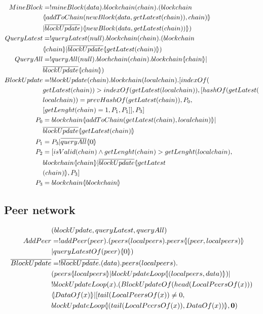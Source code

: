 \begin{align*}
    MineBlock &= !mineBlock(data).blockchain(chain).(blockchain\\
        &\lift{}{addToChain(newBlock(data,getLatest(chain)),chain)}\\
        &|\overline{blockUpdate})\lift{}{newBlock(data, getLatest(chain))})\\
    QueryLatest &=!queryLatest(null).blockchain(chain).(blockchain\\
        &\lift{}{chain}|\overline{blockUpdate}\lift{}{getLatest(chain)})\\
        QueryAll &= !queryAll(null).blochchain(chain).blockchain\lift{}{chain}|\\
        &\overline{blockUpdate}\lift{}{chain})\\
    BlockUpdate &= !blockUpdate(chain).blockchain(localchain).[indexOf(\\
        &getLatest(chain))>indexOf(getLatest(localchain)),[hashOf(getLatest(\\
        &localchain))=prevHashOf(getLatest(chain)),P_0,\\
        &[getLenght(chain)=1,P_1,P_1]],P_3]\\
    P_0 &= blockchain\lift{}{addToChain(getLatest(chain),localchain)}|\\
        &\overline{blockUpdate}\lift{}{getLatest(chain)}\\
    P_1 &= P_3|\overline{queryAll}\lift{}{0}\\
    P_2 &= [isValid(chain) \land getLenght(chain) > getLenght(localchain),\\
        &blockchain\lift{}{chain}|\overline{blockUpdate}\lift{}{getLatest\\
        &(chain)},P_3]\\
    P_3 &= blockchain\lift{}{blockchain}
\end{align*}

\subsection{Peer network}

\begin{align*}
    &(blockUpdate, queryLatest, queryAll)\\
    AddPeer &= !addPeer(peer).(peers(localpeers).peers\lift{}{(peer,localpeers)}\\
        &|queryLatestOf(peer)\lift{}{0})\\
    \overline{BlockUpdate} &= !\overline{blockUpdate}.(data).peers(localpeers).\\
        &(peers\lift{}{localpeers}|blockUpdateLoop\lift{}{(localpeers,data)})|\\
        &!blockUpdateLoop(x).(BlockUpdateOf(head(LocalPeersOf(x)))\\
        &\lift{}{DataOf(x)}|[tail(LocalPeersOf(x))\not= 0,\\
        &blockUpdateLoop\lift{}{(tail(LocalPeersOf(x)),DataOf(x))},\nil)
\end{align*}